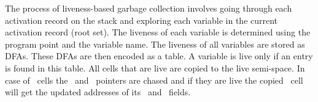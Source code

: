 \documentclass[9pt]{sigplanconf}
\newcommand{\comment}[1]{{\color{Myblue}{(#1)}}}
\begin{document}

The process of liveness-based garbage collection involves going through 
each activation record on the stack and exploring each variable in the 
current activation record (root set). The liveness of each variable is 
determined using the program point and the variable name. The liveness 
of all variables are stored as DFAs. These DFAs are then encoded as a 
table. A variable is live only if an entry is found in this table.
All cells that are live are copied to the live semi-space. In case of 
\CONS\ cells the \CAR\ and \CDR\ pointers are chased and if they are 
live the copied \CONS\ cell will get the updated addresses of its 
\CAR\ and \CDR\ fields.


\end{document}
